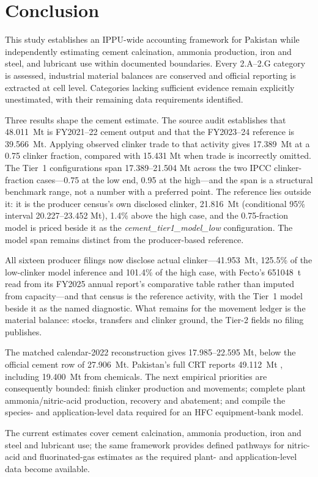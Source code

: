 \section{Conclusion}
\label{sec:conclusion}

This study establishes an IPPU-wide accounting framework for Pakistan while independently
estimating cement calcination, ammonia production, iron and steel, and lubricant use within documented boundaries. Every 2.A--2.G category is assessed,
industrial material balances are conserved and official reporting is extracted at cell level.
Categories lacking sufficient evidence remain explicitly unestimated, with their remaining
data requirements identified.

Three results shape the cement estimate. The source audit establishes that
\SI{48.011}{\mega\tonne} is FY2021--22 cement output and that the FY2023--24 reference is
\SI{39.566}{\mega\tonne}. Applying observed clinker trade to that activity gives
\SI{17.389}{\mega\tonne} \COtwo{} at a 0.75 clinker fraction, compared with 15.431 Mt when
trade is incorrectly omitted. The Tier~1 configurations span 17.389--21.504 Mt across the
two IPCC clinker-fraction cases---0.75 at the low end, 0.95 at the high---and the span is a
structural benchmark range, not a number with a preferred point. The reference lies outside
it: it is the producer census's own disclosed clinker, \SI{21.816}{\mega\tonne}
\COtwo{} (conditional 95\% interval 20.227--23.452 Mt), 1.4\% above the high case, and the
0.75-fraction model is priced beside it as the \emph{cement\_tier1\_model\_low}
configuration. The model span remains distinct from the producer-based reference.

All sixteen producer filings now disclose actual clinker---\SI{41.953}{\mega\tonne},
125.5\% of the low-clinker model inference and 101.4\% of the high case, with Fecto's
\SI{651048}{\tonne} read from its FY2025 annual report's comparative table rather than
imputed from capacity---and that census is the reference activity, with the
Tier~1 model beside it as the named diagnostic. What remains for the movement ledger is
the material balance: stocks, transfers and clinker ground, the Tier-2 fields no filing
publishes.

The matched calendar-2022 reconstruction gives 17.985--22.595 Mt, below the official cement
row of \SI{27.906}{\mega\tonne}. Pakistan's full CRT reports
\SI{49.112}{\mega\tonne} \COe{}, including \SI{19.400}{\mega\tonne} from chemicals. The next
empirical priorities are consequently bounded: finish clinker production and movements;
complete plant ammonia/nitric-acid production, recovery and abatement; and compile the
species- and application-level data required for an HFC equipment-bank model.

The current estimates cover cement calcination, ammonia production, iron and steel and
lubricant use; the same framework provides defined pathways for nitric-acid and
fluorinated-gas estimates as the required plant- and application-level data become available.
